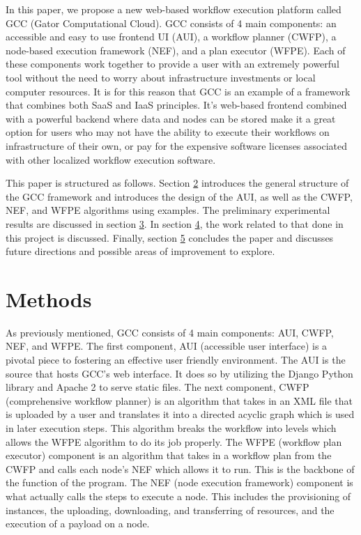 \documentclass[fleqn,10pt]{SelfArx} %
\begin{document}
In this paper, we propose a new web-based workflow execution platform called GCC (Gator Computational Cloud). GCC consists of 4 main components: an accessible and easy to use frontend UI (AUI), a workflow planner (CWFP), a node-based execution framework (NEF), and a plan executor (WFPE). Each of these components work together to provide a user with an extremely powerful tool without the need to worry about infrastructure investments or local computer resources. It is for this reason that GCC is an example of a framework that combines both SaaS and IaaS principles. It’s web-based frontend combined with a powerful backend where data and nodes can be stored make it a great option for users who may not have the ability to execute their workflows on infrastructure of their own, or pay for the expensive software licenses associated with other localized workflow execution software.

This paper is structured as follows. Section \hyperref[sec:methods]{2} introduces the general structure of the GCC framework and introduces the design of the AUI, as well as the CWFP, NEF, and WFPE algorithms using examples. The preliminary experimental results are discussed in section \hyperref[sec:expresults]{3}. In section \hyperref[sec:relatedwork]{4}, the work related to that done in this project is discussed. Finally, section \hyperref[sec:conclusion]{5} concludes the paper and discusses future directions and possible areas of improvement to explore.


\section{Methods}
\label{sec:methods}

As previously mentioned, GCC consists of 4 main components: AUI, CWFP, NEF, and WFPE. The first component, AUI (accessible user interface) is a pivotal piece to fostering an effective user friendly environment. The AUI is the source that hosts GCC’s web interface. It does so by utilizing the Django Python library and Apache 2 to serve static files. The next component, CWFP (comprehensive workflow planner) is an algorithm that takes in an XML file that is uploaded by a user and translates it into a directed acyclic graph which is used in later execution steps. This algorithm breaks the workflow into levels which allows the WFPE algorithm to do its job properly. The WFPE (workflow plan executor) component is an algorithm that takes in a workflow plan from the CWFP and calls each node’s NEF which allows it to run. This is the backbone of the function of the program. The NEF (node execution framework) component is what actually calls the steps to execute a node. This includes the provisioning of instances, the uploading, downloading, and transferring of resources, and the execution of a payload on a node.
\end{document}
